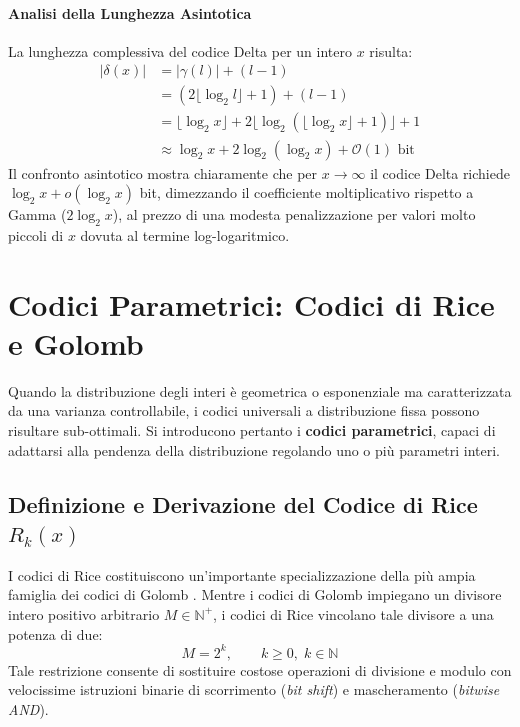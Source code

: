 \paragraph{Analisi della Lunghezza Asintotica}
La lunghezza complessiva del codice Delta per un intero $x$ risulta:
\begin{align}
  |\delta(x)| &= |\gamma(l)| + (l - 1) \nonumber \\
  &= (2\lfloor \log_2 l \rfloor + 1) + (l - 1) \nonumber \\
  &= \lfloor \log_2 x \rfloor + 2\lfloor \log_2(\lfloor \log_2 x \rfloor + 1) \rfloor + 1 \nonumber \\
  &\approx \log_2 x + 2\log_2(\log_2 x) + \mathcal{O}(1) \text{ bit}
\end{align}
Il confronto asintotico mostra chiaramente che per $x \to \infty$ il codice Delta richiede $\log_2 x + o(\log_2 x)$ bit, dimezzando il coefficiente moltiplicativo rispetto a Gamma ($2\log_2 x$), al prezzo di una modesta penalizzazione per valori molto piccoli di $x$ dovuta al termine log-logaritmico.

\FloatBarrier
\section{Codici Parametrici: Codici di Rice e Golomb}
\label{sec:codici-rice-golomb}

Quando la distribuzione degli interi \`e geometrica o esponenziale ma caratterizzata da una varianza controllabile, i codici universali a distribuzione fissa possono risultare sub-ottimali. Si introducono pertanto i \textbf{codici parametrici}, capaci di adattarsi alla pendenza della distribuzione regolando uno o pi\`u parametri interi.

\FloatBarrier
\subsection{Definizione e Derivazione del Codice di Rice $R_k(x)$}
\label{subsec:def-rice}

I codici di Rice \cite{rice1979} costituiscono un'importante specializzazione della pi\`u ampia famiglia dei codici di Golomb \cite{golomb1966}. Mentre i codici di Golomb impiegano un divisore intero positivo arbitrario $M \in \mathbb{N}^+$, i codici di Rice vincolano tale divisore a una potenza di due:
\begin{equation}
  M = 2^k, \qquad k \ge 0, \; k \in \mathbb{N}
\end{equation}
Tale restrizione consente di sostituire costose operazioni di divisione e modulo con velocissime istruzioni binarie di scorrimento (\textit{bit shift}) e mascheramento (\textit{bitwise AND}).

